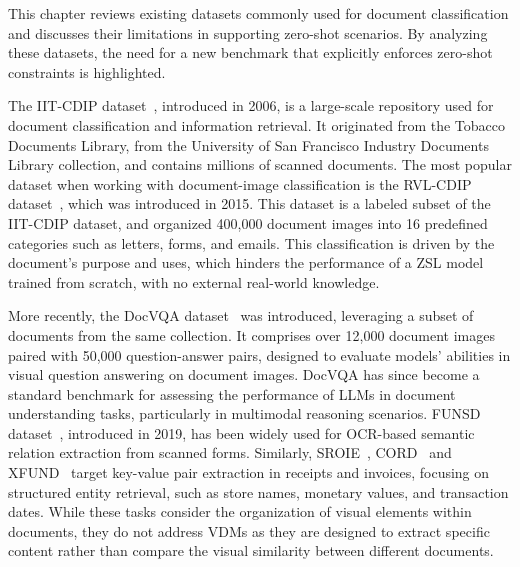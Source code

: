 This chapter reviews existing datasets commonly used for document classification and discusses their limitations in supporting zero-shot scenarios. By analyzing these datasets, the need for a new benchmark that explicitly enforces zero-shot constraints is highlighted.

The IIT-CDIP dataset~\cite{lewis_iit-cdip_2006}, introduced in 2006, is a large-scale repository used for document classification and information retrieval. It originated from the Tobacco Documents Library, from the University of San Francisco Industry Documents Library collection, and contains millions of scanned documents. The most popular dataset when working with document-image classification is the RVL-CDIP dataset~\cite{harley_evaluation_2015}, which was introduced in 2015. This dataset is a labeled subset of the IIT-CDIP dataset, and organized 400,000 document images into 16 predefined categories such as letters, forms, and emails. This classification is driven by the document's purpose and uses, which hinders the performance of a ZSL model trained from scratch, with no external real-world knowledge.

More recently, the DocVQA dataset~\cite{mathew_docvqa_2021} was introduced, leveraging a subset of documents from the same collection. It comprises over 12,000 document images paired with 50,000 question-answer pairs, designed to evaluate models’ abilities in visual question answering on document images. DocVQA has since become a standard benchmark for assessing the performance of \glspl{LLM} in document understanding tasks, particularly in multimodal reasoning scenarios. FUNSD dataset~\cite{jaume_funsd_2019}, introduced in 2019, has been widely used for OCR-based semantic relation extraction from scanned forms. Similarly, SROIE~\cite{huang_icdar2019_2019}, CORD~\cite{park_cord_2019} and XFUND~\cite{xu_layoutxlm_2021} target key-value pair extraction in receipts and invoices, focusing on structured entity retrieval, such as store names, monetary values, and transaction dates. While these tasks consider the organization of visual elements within documents, they do not address \glspl{VDM} as they are designed to extract specific content rather than compare the visual similarity between different documents.

